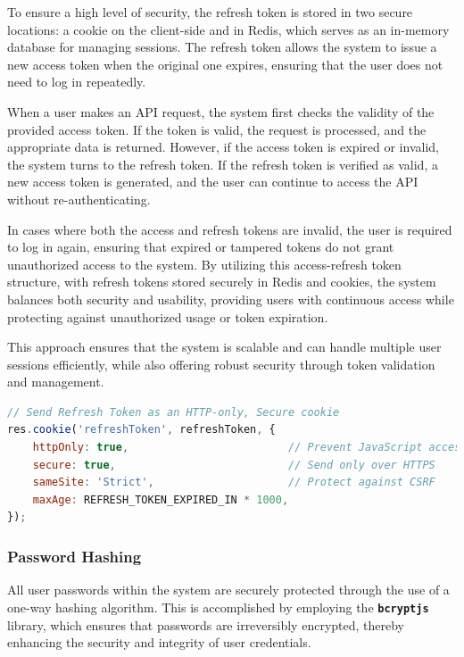 	\noindent To ensure a high level of security, the refresh token is stored in two secure locations: a cookie on the client-side and in Redis, which serves as an in-memory database for managing sessions. The refresh token allows the system to issue a new access token when the original one expires, ensuring that the user does not need to log in repeatedly.
	
	\noindent When a user makes an API request, the system first checks the validity of the provided access token. If the token is valid, the request is processed, and the appropriate data is returned. However, if the access token is expired or invalid, the system turns to the refresh token. If the refresh token is verified as valid, a new access token is generated, and the user can continue to access the API without re-authenticating.
	
	\noindent In cases where both the access and refresh tokens are invalid, the user is required to log in again, ensuring that expired or tampered tokens do not grant unauthorized access to the system. By utilizing this access-refresh token structure, with refresh tokens stored securely in Redis and cookies, the system balances both security and usability, providing users with continuous access while protecting against unauthorized usage or token expiration.
	
	\noindent This approach ensures that the system is scalable and can handle multiple user sessions efficiently, while also offering robust security through token validation and management.

\begin{lstlisting}[language=Javascript, breaklines=true, caption=Store refresh token in secure cookie]
// Send Refresh Token as an HTTP-only, Secure cookie
res.cookie('refreshToken', refreshToken, {
	httpOnly: true,       					// Prevent JavaScript access to the cookie
	secure: true,         					// Send only over HTTPS
	sameSite: 'Strict',   					// Protect against CSRF
	maxAge: REFRESH_TOKEN_EXPIRED_IN * 1000, 
});
\end{lstlisting}

	\subsubsection{Password Hashing}
	All user passwords within the system are securely protected through the use of a one-way hashing algorithm. This is accomplished by employing the \texttt{\textbf{bcryptjs}} library, which ensures that passwords are irreversibly encrypted, thereby enhancing the security and integrity of user credentials. \\
	
